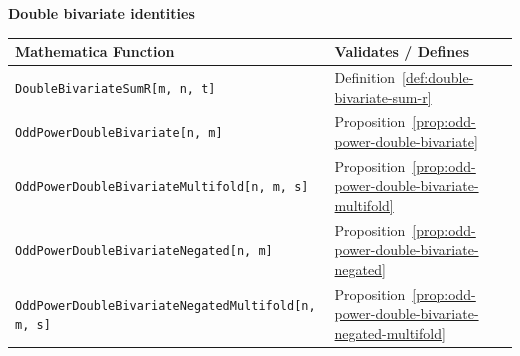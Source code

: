 \textbf{Double bivariate identities}
\begin{center}
    \renewcommand{\arraystretch}{1.3}
    \begin{tabular}{ll}
        \toprule
        \textbf{Mathematica Function}                             & \textbf{Validates / Defines}                                        \\
        \midrule
        \texttt{DoubleBivariateSumR[m, n, t]}                     & Definition~\ref{def:double-bivariate-sum-r}                         \\
        \texttt{OddPowerDoubleBivariate[n, m]}                    & Proposition~\ref{prop:odd-power-double-bivariate}                   \\
        \texttt{OddPowerDoubleBivariateMultifold[n, m, s]}        & Proposition~\ref{prop:odd-power-double-bivariate-multifold}         \\
        \texttt{OddPowerDoubleBivariateNegated[n, m]}             & Proposition~\ref{prop:odd-power-double-bivariate-negated}           \\
        \texttt{OddPowerDoubleBivariateNegatedMultifold[n, m, s]} & Proposition~\ref{prop:odd-power-double-bivariate-negated-multifold} \\
        \bottomrule
    \end{tabular}
\end{center}


